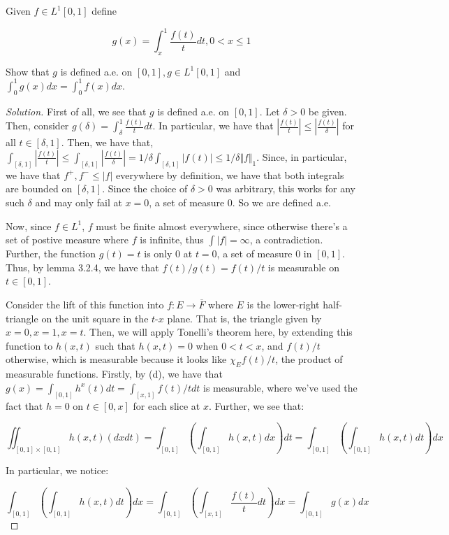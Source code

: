\documentclass[10pt]{article}
\newenvironment{problem}[2][Problem]{\begin{trivlist}
\item[\hskip \labelsep {\bfseries #1}\hskip \labelsep {\bfseries #2.}]}{\end{trivlist}}
\begin{document}
\begin{problem}{4.6.20}
Given $f \in L^1[0,1]$ define

$$g(x) = \int_x^1 \frac{f(t)}{t} dt, 0 < x \leq 1$$

Show that $g$ is defined a.e. on $[0,1], g \in L^1[0,1]$ and $\int_0^1 g(x)dx = \int_0^1 f(x)dx$.
\end{problem}
\begin{proof}[Solution]

First of all, we see that $g$ is defined a.e. on $[0,1]$. Let $\delta > 0$ be given. Then, consider $g(\delta) = \int_\delta^1 \frac{f(t)}{t} dt$. In particular, we have that $|\frac{f(t)}{t}| \leq |\frac{f(t)}{\delta}|$ for all $t \in [\delta,1]$. Then, we have that, $\int_{[\delta,1]} | \frac{f(t)}{t}| \leq \int_{[\delta,1]}  |\frac{f(t)}{\delta}|= 1/\delta \int_{ [\delta,1]} |f(t)| \leq 1/\delta \Vert f \Vert_1$. Since, in particular, we have that $f^+, f^- \leq |f|$ everywhere by definition, we have that both integrals are bounded on $[\delta,1]$. Since the choice of $\delta > 0$ was arbitrary, this works for any such $\delta$ and may only fail at $x =0$, a set of measure 0. So we are defined a.e.

Now, since $f \in L^1$, $f$ must be finite almost everywhere, since otherwise there's a set of postive measure where $f$ is infinite, thus $\int |f| = \infty$, a contradiction. Further, the function $g(t) = t$ is only $0$ at $t = 0$, a set of measure 0 in $[0,1]$. Thus, by lemma 3.2.4, we have that $f(t)/g(t) = f(t)/t$ is measurable on $t \in [0,1]$.

Consider the lift of this function into $f: E \to \overline{F}$ where $E$ is the lower-right half-triangle on the unit square in the $t$-$x$ plane. That is, the triangle given by $x = 0, x  = 1, x = t$. Then, we will apply Tonelli's theorem here, by extending this function to $h(x,t)$ such that $h(x,t) = 0$ when $0 < t < x$, and $f(t)/t$ otherwise, which is measurable because it looks like $\chi_E f(t)/t$, the product of measurable functions. Firstly, by (d), we have that $g(x) = \int_{[0,1]}  h^x(t) dt = \int_{[x,1]} f(t)/t dt$ is measurable, where we've used the fact that $h = 0$ on $t \in [0,x]$ for each slice at $x$. Further, we see that:

$$\iint_{[0,1]\times [0,1]} h(x,t) (dxdt) = \int_{[0,1]} \left( \int_{[0,1]} h(x,t) dx \right)dt =\int_{[0,1]} \left( \int_{[0,1]} h(x,t) dt \right)dx $$

In particular, we notice:

$$ \int_{[0,1]} \left( \int_{[0,1]} h(x,t) dt \right)dx = \int_{[0,1]} \left( \int_{[x,1]} \frac{f(t)}{t} dt \right) dx =  \int_{[0,1]} g(x) dx  $$


\end{proof}
\end{document}
